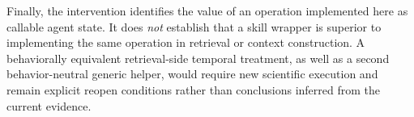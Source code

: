 Finally, the intervention identifies the value of an operation implemented here as callable agent state. It does \emph{not} establish that a skill wrapper is superior to implementing the same operation in retrieval or context construction. A behaviorally equivalent retrieval-side temporal treatment, as well as a second behavior-neutral generic helper, would require new scientific execution and remain explicit reopen conditions rather than conclusions inferred from the current evidence.
